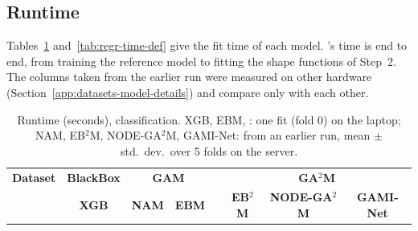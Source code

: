 

\begin{table}[!htbp]
\centering
\caption{Depth ladders: score (mean $\pm$ std.\ dev.\ over 5-fold CV; RMSE for Bike Sharing, accuracy otherwise) and conditional interactions (\#) at $d_{\max} = 1, \ldots, 6$. Gap closed at $d_{\max} = 1, \ldots, 6$: Bike Sharing 43, 62, 71, 78, 83, 85\,\%; Bank 17, 36, 44, 55, 53, 64\,\%; Phoneme 10, 31, 41, 43, 45, 59\,\%; Adult has no gap to close.}
\label{tab:depth-ladders}
\end{table}

\subsection{Runtime}

Tables~\ref{tab:clf-time-def} and~\ref{tab:regr-time-def} give the fit time of each model. \method{}'s time is end to end, from training the reference model to fitting the shape functions of Step~2. The columns taken from the earlier run were measured on other hardware (Section~\ref{app:datasets-model-details}) and compare only with each other.

\begin{table}[!htbp]
\caption{Runtime (seconds), classification. XGB, EBM, \method{}: one fit (fold 0) on the laptop; NAM, EB$^2$M, NODE-GA$^2$M, GAMI-Net: from an earlier run, mean $\pm$ std.\ dev.\ over 5 folds on the server.}
\label{tab:clf-time-def}
\centering
\small
\begin{tabular}{lccccccc}
\toprule
\textbf{Dataset} & \multicolumn{1}{c}{\textbf{BlackBox}} & \multicolumn{2}{c}{\textbf{GAM}} & \multicolumn{1}{c}{\textbf{\method{}}} & \multicolumn{3}{c}{\textbf{GA$^2$M}} \\
\cmidrule(lr){2-2} \cmidrule(lr){3-4}  \cmidrule(lr){6-8}
& \textbf{XGB} & \textbf{NAM} & \textbf{EBM} &   & \textbf{EB$^2$M} & \textbf{NODE-GA$^2$M} & \textbf{GAMI-Net} \\
\midrule

\end{tabular}
\end{table}

